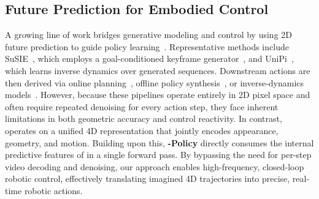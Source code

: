 \subsection{Future Prediction for Embodied Control}
A growing line of work bridges generative modeling and control by using 2D future prediction to guide policy learning~\citep{bharadhwaj2024gen2act,ye2024latent,ye2026world,bi2025motus,hu2024video}. Representative methods include SuSIE~\citep{black2023zero}, which employs a goal-conditioned keyframe generator~\citep{brooks2023instructpix2pix}, and UniPi~\citep{du2023learning}, which learns inverse dynamics over generated sequences. Downstream actions are then derived via online planning~\citep{hu2024video,williams2017model,hafner2019learning,pineau2003point}, offline policy synthesis~\citep{hafner2019dream,hansen2023td,chua2018deep,hafner2025training}, or inverse-dynamics models~\citep{du2023learning,bi2025motus}. However, because these pipelines operate entirely in 2D pixel space and often require repeated denoising for every action step, they face inherent limitations in both geometric accuracy and control reactivity.
In contrast, \textbf{\our} operates on a unified 4D representation that jointly encodes appearance, geometry, and motion. Building upon this, \textbf{\our-Policy} directly consumes the internal predictive features of \our in a single forward pass. By bypassing the need for per-step video decoding and denoising, our approach enables high-frequency, closed-loop robotic control, effectively translating imagined 4D trajectories into precise, real-time robotic actions.

